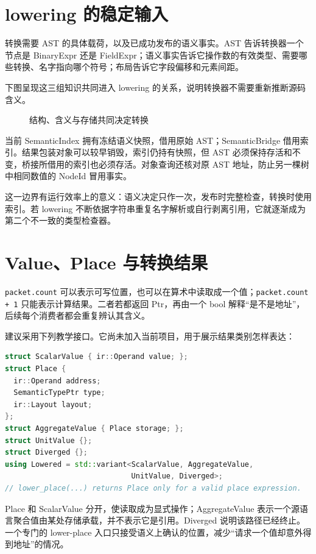\section{lowering 的稳定输入}
转换需要 AST 的具体载荷，以及已成功发布的语义事实。AST 告诉转换器一个节点是 BinaryExpr 还是 FieldExpr；语义事实告诉它操作数的有效类型、需要哪些转换、名字指向哪个符号；布局告诉它字段偏移和元素间距。

下图呈现这三组知识共同进入 lowering 的关系，说明转换器不需要重新推断源码含义。
\begin{figure}[htbp]\centering
{}
\caption{结构、含义与存储共同决定转换}
\end{figure}

当前 SemanticIndex 拥有冻结语义快照，借用原始 AST；SemanticBridge 借用索引。结果包装对象可以较早销毁，索引仍持有快照，但 AST 必须保持存活和不变，桥接所借用的索引也必须存活。对象查询还核对原 AST 地址，防止另一棵树中相同数值的 NodeId 冒用事实。

这一边界有运行效率上的意义：语义决定只作一次，发布时完整检查，转换时使用索引。若 lowering 不断依据字符串重复名字解析或自行剥离引用，它就逐渐成为第二个不一致的类型检查器。

\section{Value、Place 与转换结果}
\texttt{packet.count} 可以表示可写位置，也可以在算术中读取成一个值；\texttt{packet.count + 1} 只能表示计算结果。二者若都返回 Ptr，再由一个 bool 解释“是不是地址”，后续每个消费者都会重复辨认其含义。

建议采用下列教学接口。它尚未加入当前项目，用于展示结果类别怎样表达：
\begin{lstlisting}[language=C++,caption={设计推导：值、位置与发散结果}]
struct ScalarValue { ir::Operand value; };
struct Place {
  ir::Operand address;
  SemanticTypePtr type;
  ir::Layout layout;
};
struct AggregateValue { Place storage; };
struct UnitValue {};
struct Diverged {};
using Lowered = std::variant<ScalarValue, AggregateValue,
                             UnitValue, Diverged>;
// lower_place(...) returns Place only for a valid place expression.
\end{lstlisting}
Place 和 ScalarValue 分开，使读取成为显式操作；AggregateValue 表示一个源语言聚合值由某处存储承载，并不表示它是引用。Diverged 说明该路径已经终止。一个专门的 lower-place 入口只接受语义上确认的位置，减少“请求一个值却意外得到地址”的情况。

